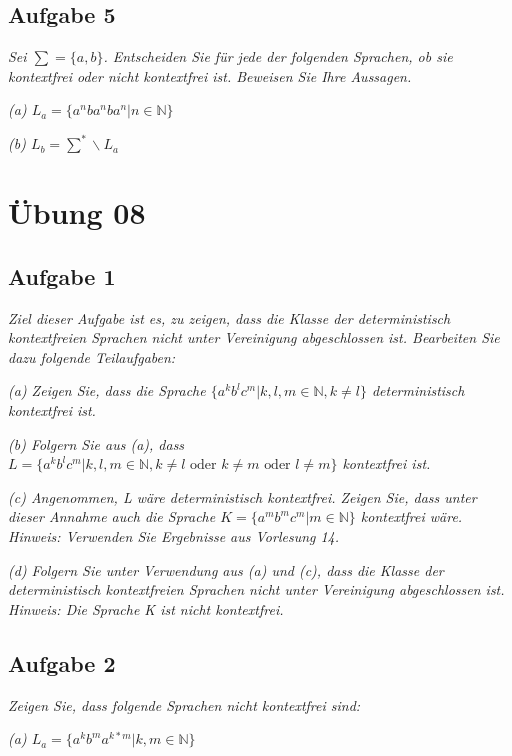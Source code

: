 \documentclass[a4paper]{article}
\begin{document}
\subsection{Aufgabe 5}
\textit{Sei $\sum = \{a, b\}$. Entscheiden Sie für jede der folgenden Sprachen, ob sie kontextfrei oder nicht kontextfrei ist. Beweisen Sie Ihre Aussagen.}

\textit{(a) $L_a = \{a^n ba^n ba^n | n\in\mathbb{N}\}$}

\textit{(b) $L_b = \sum^*\backslash L_a$ }


\newpage
\section{Übung 08}
\subsection{Aufgabe 1}
\textit{Ziel dieser Aufgabe ist es, zu zeigen, dass die Klasse der deterministisch kontextfreien Sprachen nicht unter Vereinigung abgeschlossen ist. Bearbeiten Sie dazu folgende Teilaufgaben:}

\textit{(a) Zeigen Sie, dass die Sprache $\{a^k b^l c^m | k, l, m \in\mathbb{N}, k \not= l \}$ deterministisch kontextfrei ist.}

\textit{(b) Folgern Sie aus (a), dass $L = \{a^k b^l c^m | k, l, m\in\mathbb{N}, k \not= l \text{ oder } k\not=m \text{ oder } l\not=m\}$ kontextfrei ist.}

\textit{(c) Angenommen, L wäre deterministisch kontextfrei. Zeigen Sie, dass unter dieser Annahme auch die Sprache $K=\{a^m b^m c^m | m\in\mathbb{N}\}$ kontextfrei wäre. Hinweis: Verwenden Sie Ergebnisse aus Vorlesung 14.}

\textit{(d) Folgern Sie unter Verwendung aus (a) und (c), dass die Klasse der deterministisch kontextfreien Sprachen nicht unter Vereinigung abgeschlossen ist. Hinweis: Die Sprache K ist nicht kontextfrei.}

\subsection{Aufgabe 2}
\textit{Zeigen Sie, dass folgende Sprachen nicht kontextfrei sind:}

\textit{(a) $L_a = \{a^k b^m a^{k*m} | k, m\in\mathbb{N}\}$ }
\end{document}
